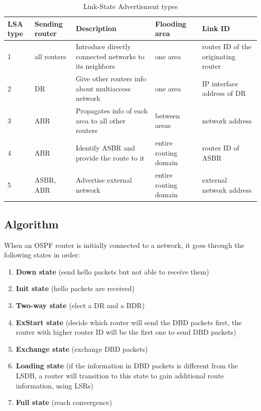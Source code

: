 \begin{table}[h]
\centering
\caption{Link-State Advertisment types}
\label{LSA-type}
\begin{tabular}{@{} p{2em} p{3em} p{10em} p{5em} p{9em} @{}}
\toprule
LSA type & Sending router & Description                                            & Flooding area        & Link ID                             \\ \midrule
1        & all routers    & Introduce directly connected networks to its neighbors & one area             & router ID of the originating router \\
2        & DR             & Give other routers info about multiaccess network      & one area             & IP interface address of DR		\\
3        & ABR            & Propagates info of each area to all other routers      & between areas        & network address                 \\ 
4        & ABR            & Identify ASBR and provide the route to it              & entire routing domain& router ID of ASBR                 \\ 
5        & ASBR, ABR      & Advertise external network                             & entire routing domain& external network address         \\ \bottomrule
\end{tabular}
\end{table}

\subsection{Algorithm}\label{sec:algorithm}
When an OSPF router is initially connected to a network, it goes through the following states in order:
\begin{enumerate}
	\item \textbf{Down state} (send hello packets but not able to receive them)
	\item \textbf{Init state} (hello packets are received)
	\item \textbf{Two-way state} (elect a DR and a BDR)
	\item \textbf{ExStart state} (decide which router will send the DBD packets first, the router with higher router ID will be the first one to send DBD packets)%
	\item \textbf{Exchange state} (exchange DBD packets)
	\item \textbf{Loading state} (if the information in DBD packets is different from the LSDB, a router will transition to this state to gain additional route information, using LSRs)
	\item \textbf{Full state} (reach convergence)
\end{enumerate}

